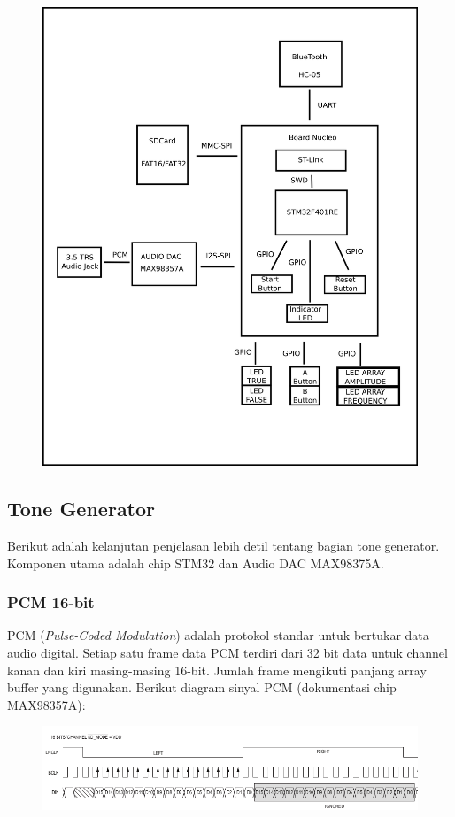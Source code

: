\documentclass[12pt,]{article}
\begin{document}
	\begin{figure}[H]
		\centering
		\includegraphics[width=0.6\linewidth]{images/overview}
	\end{figure}

	\newpage
	\subsection{Tone Generator}
	Berikut adalah kelanjutan penjelasan lebih detil tentang bagian tone generator.
	Komponen utama adalah chip STM32 dan Audio DAC MAX98375A.

	\subsubsection{PCM 16-bit}
	PCM (\textit{Pulse-Coded Modulation}) adalah protokol standar untuk bertukar data audio digital.
	Setiap satu frame data PCM terdiri dari 32 bit data untuk channel kanan dan kiri masing-masing 16-bit.
	Jumlah frame mengikuti panjang array buffer yang digunakan.
	Berikut diagram sinyal PCM (dokumentasi chip MAX98357A):
	\begin{figure}[H]
		\centering
		\includegraphics[width=\linewidth]{images/PCM}
	\end{figure}
\end{document}
